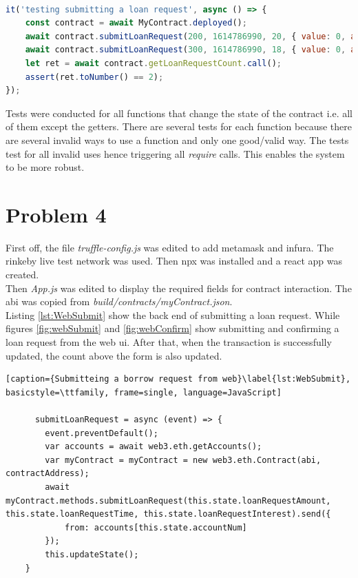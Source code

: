 \documentclass[a4paper, 12pt]{article}
\begin{document}
\begin{lstlisting}[caption={Borrower submitting a load request}, basicstyle=\ttfamily, frame=single, language=JavaScript]
  
it('testing submitting a loan request', async () => {
	const contract = await MyContract.deployed();
	await contract.submitLoanRequest(200, 1614786990, 20, { value: 0, account: borrower });
	await contract.submitLoanRequest(300, 1614786990, 18, { value: 0, account: borrower });
	let ret = await contract.getLoanRequestCount.call();
	assert(ret.toNumber() == 2);
});

\end{lstlisting}

Tests were conducted for all functions that change the state of the contract i.e. all of them except the getters.
There are several tests for each function because there are several invalid ways to use a function and only one good/valid way. The tests test for all invalid uses hence triggering all \textit{require} calls. This enables the system to be more robust.

\section{Problem 4}
First off, the file \textit{truffle-config.js} was edited to add metamask and infura. The rinkeby live test network was used. Then npx was installed and a react app was created. 
\\

Then \textit{App.js} was edited to display the required fields for contract interaction. The abi was copied from \textit{build/contracts/myContract.json}.
\\
Listing \ref{lst:WebSubmit} show the back end of submitting a loan request. While figures \ref{fig:webSubmit} and \ref{fig:webConfirm} show submitting and confirming a loan request from the web ui. After that, when the transaction is successfully updated, the count above the form is also updated.

\begin{lstlisting}[caption={Submitteing a borrow request from web}\label{lst:WebSubmit}, basicstyle=\ttfamily, frame=single, language=JavaScript]
	
	  submitLoanRequest = async (event) => {
		event.preventDefault();
		var accounts = await web3.eth.getAccounts();
		var myContract = myContract = new web3.eth.Contract(abi, contractAddress);
		await myContract.methods.submitLoanRequest(this.state.loanRequestAmount, this.state.loanRequestTime, this.state.loanRequestInterest).send({
			from: accounts[this.state.accountNum]
		});
		this.updateState();
	}
	
\end{lstlisting}
\end{document}
